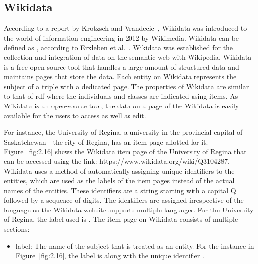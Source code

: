 \begin{doublespace}
\subsection{Wikidata}
\par According to a report by Krotzsch and Vrandecic~\cite{denny2014wikidata}, Wikidata was introduced to the world of information engineering in 2012 by Wikimedia. Wikidata can be defined as , according to Erxleben et al.~\cite{fredo2014intro}. Wikidata was established for the collection and integration of data on the semantic web with Wikipedia. Wikidata is a free open-source tool that handles a large amount of structured data and maintains pages that store the data. Each entity on Wikidata represents the subject of a triple with a dedicated page. The properties of Wikidata are similar to that of \ac{rdf} where the individuals and classes are indicated using items. As Wikidata is an open-source tool, the data on a page of the Wikidata is easily available for the users to access as well as edit.
\par For instance, the University of Regina, a university in the provincial capital of Saskatchewan—the city of Regina, has an item page allotted for it. Figure~\ref{fig:2.16} shows the Wikidata item page of the University of Regina that can be accessed using the link: https://www.wikidata.org/wiki/Q3104287. Wikidata uses a method of automatically assigning unique identifiers to the entities, which are used as the labels of the item pages instead of the actual names of the entities. These identifiers are a string starting with a capital Q followed by a sequence of digits. The identifiers are assigned irrespective of the language as the Wikidata website supports multiple languages. For the University of Regina, the label used is . The item page on Wikidata consists of multiple sections:
\begin{itemize}
    \item label: The name of the subject that is treated as an entity. For the instance in Figure~\ref{fig:2.16}, the label is  along with the unique identifier . 
    \begin{figure}[htp]
    \centering

\end{figure}
\end{itemize}
\end{doublespace}
